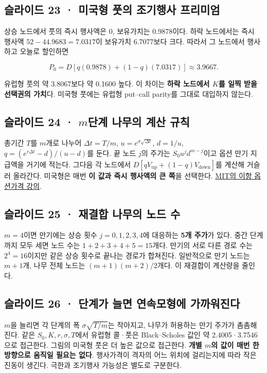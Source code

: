 \documentclass[11pt,a4paper]{article}
\begin{document}
\subsection{슬라이드 23 · 미국형 풋의 조기행사 프리미엄}
상승 노드에서 풋의 즉시 행사액은 0, 보유가치는 0.9878이다. 하락 노드에서는 즉시 행사액 $52-44.9683=7.0317$이 보유가치 6.7077보다 크다. 따라서 그 노드에서 행사하고 오늘로 할인하면\par

\[
P_0=D[q(0.9878)+(1-q)(7.0317)]\approx3.9667.
\]

유럽형 풋의 약 3.8067보다 약 0.1600 높다. 이 차이는 \textbf{하락 노드에서 $K$를 일찍 받을 선택권의 가치}다. 미국형 풋에는 유럽형 put–call parity를 그대로 대입하지 않는다.\par

\subsection{슬라이드 24 · $m$단계 나무의 계산 규칙}
총기간 $T$를 $m$개로 나누어 $\Delta t=T/m$, $u=e^{\sigma\sqrt{\Delta t}}$, $d=1/u$, $q=(e^{r\Delta t}-d)/(u-d)$를 둔다. 끝 노드 $j$의 주가는 $S_0u^jd^{m-j}$이고 옵션 만기 지급액을 거기에 적는다. 그다음 각 노드에서 $D[qV_{\mathrm{up}}+(1-q)V_{\mathrm{down}}]$를 계산해 거슬러 올라간다. 미국형은 매번 \textbf{이 값과 즉시 행사액의 큰 쪽}을 선택한다. \href{https://ocw.mit.edu/courses/15-401-finance-theory-i-fall-2008/pages/video-lectures-and-slides/options/}{MIT의 이항 옵션가격 강의}.\par

\subsection{슬라이드 25 · 재결합 나무의 노드 수}
$m=4$이면 만기에는 상승 횟수 $j=0,1,2,3,4$에 대응하는 \textbf{5개 주가}가 있다. 중간 단계까지 모두 세면 노드 수는 $1+2+3+4+5=15$개다. 만기의 서로 다른 경로 수는 $2^4=16$이지만 같은 상승 횟수로 끝나는 경로가 합쳐진다. 일반적으로 만기 노드는 $m+1$개, 나무 전체 노드는 $(m+1)(m+2)/2$개다. 이 재결합이 계산량을 줄인다.\par

\subsection{슬라이드 26 · 단계가 늘면 연속모형에 가까워진다}
$m$을 늘리면 각 단계의 폭 $\sigma\sqrt{T/m}$는 작아지고, 나무가 허용하는 만기 주가가 촘촘해진다. 같은 $S_0,K,r,\sigma,T$에서 유럽형 콜·풋은 Black–Scholes 값인 약 2.4005·3.7546으로 접근한다. 그림의 미국형 풋은 더 높은 값으로 접근한다. \textbf{개별 $m$의 값이 매번 한 방향으로 움직일 필요는 없다}. 행사가격이 격자의 어느 위치에 걸리는지에 따라 작은 진동이 생긴다. 극한과 조기행사 가능성은 별도로 구분한다.\par
\end{document}
